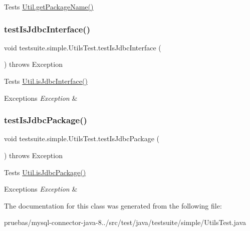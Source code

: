 Tests \mbox{\hyperlink{classcom_1_1mysql_1_1cj_1_1util_1_1_util_a142027940787b4d09dc21ea4c5de617e}{Util.\+get\+Package\+Name()}} \mbox{\label{classtestsuite_1_1simple_1_1_utils_test_a5983623d2b264a98e4d7a3859d1404c7}} 
\subsubsection{\texorpdfstring{test\+Is\+Jdbc\+Interface()}{testIsJdbcInterface()}}
{\footnotesize\ttfamily void testsuite.\+simple.\+Utils\+Test.\+test\+Is\+Jdbc\+Interface (\begin{DoxyParamCaption}{ }\end{DoxyParamCaption}) throws Exception}

Tests \mbox{\hyperlink{classcom_1_1mysql_1_1cj_1_1util_1_1_util_a6c781a9f788160ce358b6237b4a6b0da}{Util.\+is\+Jdbc\+Interface()}}


\begin{DoxyExceptions}{Exceptions}
{\em Exception} & \\
\hline
\end{DoxyExceptions}
\mbox{\label{classtestsuite_1_1simple_1_1_utils_test_acdd7d8143bc1dede650e3c5991d92193}} 
\subsubsection{\texorpdfstring{test\+Is\+Jdbc\+Package()}{testIsJdbcPackage()}}
{\footnotesize\ttfamily void testsuite.\+simple.\+Utils\+Test.\+test\+Is\+Jdbc\+Package (\begin{DoxyParamCaption}{ }\end{DoxyParamCaption}) throws Exception}

Tests \mbox{\hyperlink{classcom_1_1mysql_1_1cj_1_1util_1_1_util_a4ff66f7ccc05ec9631b13bb5e9e9fbbe}{Util.\+is\+Jdbc\+Package()}}


\begin{DoxyExceptions}{Exceptions}
{\em Exception} & \\
\hline
\end{DoxyExceptions}


The documentation for this class was generated from the following file\+:\begin{DoxyCompactItemize}
\item 
pruebas/mysql-\/connector-\/java-\/8../src/test/java/testsuite/simple/Utils\+Test.\+java\end{DoxyCompactItemize}
